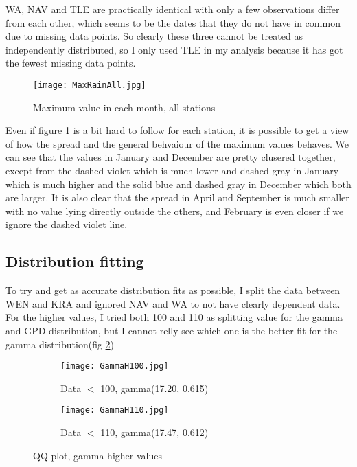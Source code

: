 \documentclass{article}
\begin{document}
	WA, NAV and TLE are practically identical with only a few observations differ from each other, which seems to be the dates that they do not have in common due to missing data points. So clearly these three cannot be treated as independently distributed, so I only used TLE in my analysis because it has got the fewest missing data points.
	
	\begin{figure}[H]
		\centering
		\texttt{[image: MaxRainAll.jpg]}
		\caption{Maximum value in each month, all stations}
		\label{MaxAll}
	\end{figure}
	Even if figure \ref{MaxAll} is a bit hard to follow for each station, it is possible to get a view of how the spread and the general behvaiour of the maximum values behaves. We can see that the values in January and December are pretty clusered together, except from the dashed violet which is much lower and dashed gray in January which is much higher and the solid blue and dashed gray in December which both are larger. It is also clear that the spread in April and September is much smaller with no value lying directly outside the others, and February is even closer if we ignore the dashed violet line. 
	
	\subsection{Distribution fitting}
	To try and get as accurate distribution fits as possible, I split the data between WEN and KRA and ignored NAV and WA to not have clearly dependent data. For the higher values, I tried both 100 and 110 as splitting value for the gamma and GPD distribution, but I cannot relly see which one is the better fit for the gamma distribution(fig \ref{GammaH})
	
	\begin{figure}[H]
		\centering
		\begin{subfigure}{0.5\textwidth}
			\centering
			\texttt{[image: GammaH100.jpg]}
			\caption{Data $<$ 100, gamma(17.20, 0.615)}
		\end{subfigure}%
		\begin{subfigure}{0.5\textwidth}
			\centering
			\texttt{[image: GammaH110.jpg]}
			\caption{Data $<$ 110, gamma(17.47, 0.612)}
		\end{subfigure}
		\caption{QQ plot, gamma higher values}
		\label{GammaH}
	\end{figure}
	
\end{document}
